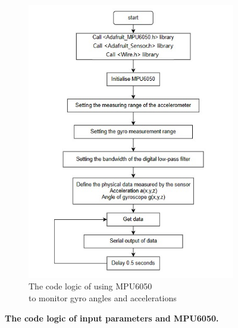 \begin{landscape}
\begin{figure}[H]
\begin{subfigure}{0.62\textwidth}
            \includegraphics[width=\linewidth]{Image/Design/code_logic_angle.jpg}
            \caption{\centering The code logic of using MPU6050 \\to monitor gyro angles and accelerations}
            \label{fig:cl_angle}
        \end{subfigure}
        \caption[The code logic of input parameters and MPU6050]
        {\centering \textbf{The code logic of input parameters and MPU6050.}}
        \label{fig:cl_input_angle}
    \end{figure}
\end{landscape}
\newpage
